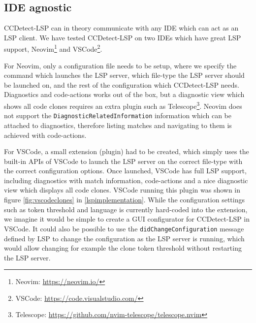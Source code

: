 \subsection*{IDE agnostic}

CCDetect-LSP can in theory communicate with any IDE which can act as an LSP client. We
have tested CCDetect-LSP on two IDEs which have great LSP support, Neovim\footnote{Neovim:
\url{https://neovim.io/}} and VSCode\footnote{VSCode:
\url{https://code.visualstudio.com/}}. 

For Neovim, only a configuration file needs to be setup, where we specify the command
which launches the LSP server, which file-type the LSP server should be launched on, and
the rest of the configuration which CCDetect-LSP needs. Diagnostics and code-actions works
out of the box, but a diagnostic view which shows all code clones requires an extra plugin
such as Telescope\footnote{Telescope:
\url{https://github.com/nvim-telescope/telescope.nvim}}. Neovim does not support the
\verb|DiagnosticRelatedInformation| information which can be attached to diagnostics,
therefore listing matches and navigating to them is achieved with code-actions.

For VSCode, a small extension (plugin) had to be created, which simply uses the built-in
APIs of VSCode to launch the LSP server on the correct file-type with the correct
configuration options. Once launched, VSCode has full LSP support, including diagnostics
with match information, code-actions and a nice diagnostic view which displays all code
clones. VSCode running this plugin was shown in figure \ref{fig:vscodeclones} in
\cref{lspimplementation}. While the configuration settings such as token threshold and
language is currently hard-coded into the extension, we imagine it would be simple to
create a GUI configurator for CCDetect-LSP in VSCode. It could also be possible to use the
\verb|didChangeConfiguration| message defined by LSP to change the configuration as the
LSP server is running, which would allow changing for example the clone token threshold
without restarting the LSP server. 
